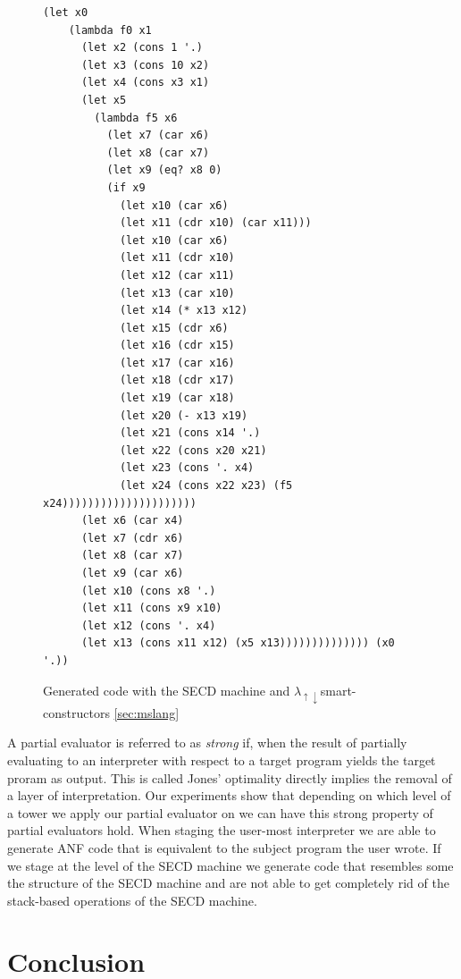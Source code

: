 \documentclass{article}
\theoremstyle{definition}
\newcommand{\mslang}{$\lambda_{\uparrow\downarrow}$}
\begin{document}
\begin{figure}[ht]
\centering
\begin{verbatim}
(let x0
	(lambda f0 x1
	  (let x2 (cons 1 '.)
	  (let x3 (cons 10 x2)
	  (let x4 (cons x3 x1)
	  (let x5
		(lambda f5 x6
		  (let x7 (car x6)
		  (let x8 (car x7)
		  (let x9 (eq? x8 0)
		  (if x9
			(let x10 (car x6)
			(let x11 (cdr x10) (car x11)))
			(let x10 (car x6)
			(let x11 (cdr x10)
			(let x12 (car x11)
			(let x13 (car x10)
			(let x14 (* x13 x12)
			(let x15 (cdr x6)
			(let x16 (cdr x15)
			(let x17 (car x16)
			(let x18 (cdr x17)
			(let x19 (car x18)
			(let x20 (- x13 x19)
			(let x21 (cons x14 '.)
			(let x22 (cons x20 x21)
			(let x23 (cons '. x4)
			(let x24 (cons x22 x23) (f5 x24)))))))))))))))))))))
	  (let x6 (car x4)
	  (let x7 (cdr x6)
	  (let x8 (car x7)
	  (let x9 (car x6)
	  (let x10 (cons x8 '.)
	  (let x11 (cons x9 x10)
	  (let x12 (cons '. x4)
	  (let x13 (cons x11 x12) (x5 x13)))))))))))))) (x0 '.))
\end{verbatim}
\caption{Generated code with the SECD machine and \mslang smart-constructors \ref{sec:mslang}}
\label{lst:secd_factorial}
\end{figure}

A partial evaluator is referred to as \textit{strong} if, when the result of partially evaluating to an interpreter with respect to a target program yields the target proram as output. This is called Jones' optimality directly implies the removal of a layer of interpretation. Our experiments show that depending on which level of a tower we apply our partial evaluator on we can have this strong property of partial evaluators hold. When staging the user-most interpreter we are able to generate ANF code that is equivalent to the subject program the user wrote. If we stage at the level of the SECD machine we generate code that resembles some the structure of the SECD machine and are not able to get completely rid of the stack-based operations of the SECD machine.

\section{Conclusion}
\end{document}
